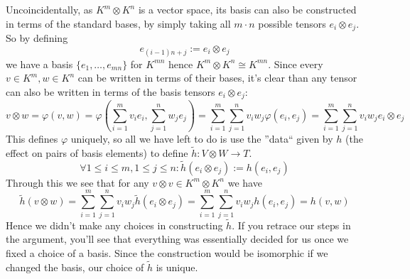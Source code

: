 Uncoincidentally, as \(K^m \otimes K^n\) is a vector space, its basis can also be constructed in terms of the standard bases, by simply taking all \(m \cdot n\) possible tensors \(e_i \otimes e_j\).
So by defining
\[e_{(i-1)n+j} := e_i \otimes e_j\]
we have a basis \(\{e_1, \ldots, e_{mn}\}\) for \(K^{mn}\) hence \(K^m \otimes K^n \cong K^{mn}\).
Since every \(v \in K^m, w \in K^n\) can be written in terms of their bases, it’s clear than any tensor can also be written in terms of the basis tensors \(e_i \otimes e_j\):
\[v \otimes w = \varphi(v, w) = \varphi\left(\sum_{i=1}^m v_i e_i, \sum_{j=1}^n w_j e_j\right) = \sum_{i=1}^m \sum_{j=1}^n v_iw_j \varphi(e_i, e_j) = \sum_{i=1}^m \sum_{j=1}^n v_iw_j e_i \otimes e_j\]
This defines \(\varphi\) uniquely, so all we have left to do is use the ''data`` given by \(h\) (the effect on pairs of basis elements) to define \(\tilde{h}: V \otimes W \to T\).
\[\forall 1\leq i\leq m, 1\leq j \leq n: \tilde{h}(e_i \otimes e_j) := h(e_i, e_j)\]
Through this we see that for any \(v \otimes v \in K^m \otimes K^n\) we have
\[\tilde{h}(v \otimes w) = \sum_{i=1}^m \sum_{j=1}^n v_i w_j \tilde{h}(e_i \otimes e_j) = \sum_{i=1}^m \sum_{j=1}^n v_i w_j h(e_i, e_j) = h(v, w)\]
Hence we didn’t make any choices in constructing \(\tilde{h}\).
If you retrace our steps in the argument, you’ll see that everything was essentially decided for us once we fixed a choice of a basis.
Since the construction would be isomorphic if we changed the basis, our choice of \(\tilde{h}\) is unique.


